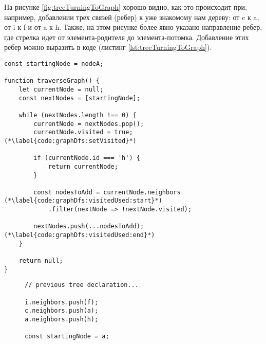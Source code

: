 \documentclass[../../article.tex]{subfiles}
\begin{document}
На рисунке \ref{fig:treeTurningToGraph} хорошо видно, как это происходит при, например, добавлении трех связей (ребер) к уже знакомому нам дереву: от {\firacodebold c} к {\firacodebold a}, от {\firacodebold i} к {\firacodebold f} и от {\firacodebold a} к {\firacodebold h}. Также, на этом рисунке более явно указано направление ребер, где стрелка идет от элемента-родителя до элемента-потомка. Добавление этих ребер можно выразить в коде (листинг \ref{lst:treeTurningToGraph}).

\begin{figure*}
    \begin{ruledelement}
        \begin{lstlisting}[caption={Обход графа в глубину}, label={lst:graphDfs}]
const startingNode = nodeA;

function traverseGraph() {
    let currentNode = null;
    const nextNodes = [startingNode];

    while (nextNodes.length !== 0) {
        currentNode = nextNodes.pop();
        currentNode.visited = true; (*\label{code:graphDfs:setVisited}*)

        if (currentNode.id === 'h') {
            return currentNode;
        }

        const nodesToAdd = currentNode.neighbors (*\label{code:graphDfs:visitedUsed:start}*)
            .filter(nextNode => !nextNode.visited);

        nextNodes.push(...nodesToAdd); (*\label{code:graphDfs:visitedUsed:end}*)
    }

    return null;
}
        \end{lstlisting}
    \end{ruledelement}

\end{figure*}

\begin{figure}
    \begin{ruledelement}
        \begin{lstlisting}[caption={Добавление связей превращающих дерево в грфа}, label={lst:treeTurningToGraph}]
// previous tree declaration...

i.neighbors.push(f);
c.neighbors.push(a);
a.neighbors.push(h);

const startingNode = a;
        \end{lstlisting}
    \end{ruledelement}
\end{figure}
\end{document}
